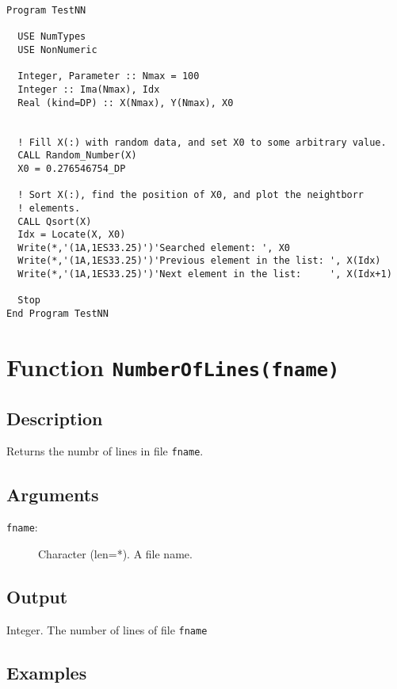 \begin{lstlisting}[emph=Locate,
                   emphstyle=\color{blue},
                   frame=trBL,
                   caption=Searching data position in an ordered list.,
                   label=locate]
Program TestNN

  USE NumTypes
  USE NonNumeric

  Integer, Parameter :: Nmax = 100
  Integer :: Ima(Nmax), Idx
  Real (kind=DP) :: X(Nmax), Y(Nmax), X0


  ! Fill X(:) with random data, and set X0 to some arbitrary value. 
  CALL Random_Number(X)
  X0 = 0.276546754_DP

  ! Sort X(:), find the position of X0, and plot the neightborr
  ! elements. 
  CALL Qsort(X)
  Idx = Locate(X, X0)
  Write(*,'(1A,1ES33.25)')'Searched element: ', X0
  Write(*,'(1A,1ES33.25)')'Previous element in the list: ', X(Idx)
  Write(*,'(1A,1ES33.25)')'Next element in the list:     ', X(Idx+1)

  Stop
End Program TestNN
\end{lstlisting}

\section{Function \texttt{NumberOfLines(fname)}}

\subsection{Description}

Returns the numbr of lines in file \texttt{fname}.

\subsection{Arguments}

\begin{description}
\item[\texttt{fname}: ] Character (len=*). A file name.
\end{description}

\subsection{Output}

Integer. The number of lines of file \texttt{fname}

\subsection{Examples}


